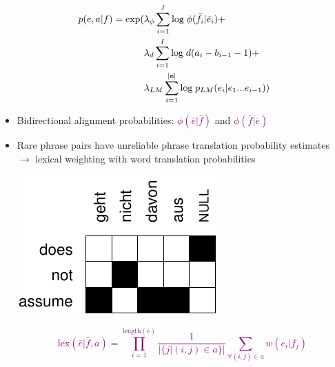 \documentclass[landscape]{slides}
\newcommand{\maths}[1]{\textcolor{purple}{#1}}
\begin{document}

\vspace{10mm}
\maths{\begin{equation*}
\begin{split}
p(e,a|f) = \text{exp}( & \lambda_{\phi} \sum_{i=1}^I \mbox{log}\; \phi(\bar{f}_i|\bar{e}_i) + \\
 & \lambda_{d} \sum_{i=1}^I \mbox{log}\; d(a_i-b_{i-1}-1) + \\
 & \lambda_{LM} \sum_{i=1}^{|{\bf e}|} \mbox{log}\; p_{LM}(e_i|e_1...e_{i-1}) )
\end{split}
\end{equation*}}


\begin{itemize}
\item Bidirectional alignment probabilities: \maths{$\phi(\bar{e}|\bar{f})$} and \maths{$\phi(\bar{f}|\bar{e})$}
\item Rare phrase pairs have unreliable phrase translation probability estimates\\[3mm]
$\rightarrow$ lexical weighting with word translation probabilities
\begin{center} \vspace{-5mm}
\includegraphics[scale=1]{lexical-weighting.pdf}
\end{center} \vspace{-10mm}
\maths{\begin{equation*}
\mbox{lex}(\bar{e}|\bar{f},a) = 
\prod_{i=1}^{\mbox{length}(\bar{e})} \frac{1}{|\{j|(i,j) \in a\}|} \sum_{\forall (i,j) \in a} w(e_i|f_j)
\end{equation*}}
\end{itemize}

\end{document}
